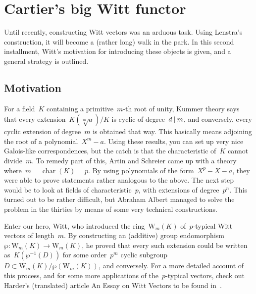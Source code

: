\section{Cartier's big Witt functor}
Until recently, constructing Witt vectors was an arduous task. Using Lenstra's construction, it will become a (rather long) walk in the park. In this second installment, Witt's motivation for introducing these objects is given, and a general strategy is outlined.

\subsection{Motivation}
For a field~$K$ containing a primitive~$m$-th root of unity, Kummer theory says that every extension~$K(\sqrt[m]a)/K$ is cyclic of degree~$d\mathbin{|} m$, and conversely, every cyclic extension of degree~$m$ is obtained that way. This basically means adjoining the root of a polynomial~$X^{m}-a$. Using these results, you can set up very nice Galois-like correspondences, but the catch is that the characteristic of~$K$ cannot divide~$m$. To remedy part of this, Artin and Schreier came up with a theory where~$m = \operatorname{char}(K) = p$. By using polynomials of the form~$X^{p}-X-a$, they were able to prove statements rather analogous to the above. The next step would be to look at fields of characteristic~$p$, with extensions of degree~$p^{n}$. This turned out to be rather difficult, but Abraham Albert managed to solve the problem in the thirties by means of some very technical constructions.

Enter our hero, Witt, who introduced the ring~$\mathrm{W}_{m}(K)$ of~$p$-typical Witt vectors of length~$m$. By constructing an (additive) group endomorphism~$\wp\colon\mathrm{W}_{m}(K)\to\mathrm{W}_{m}(K)$, he proved that every such extension could be written as~$K(\wp^{−1}(D))$ for some order~$p^{m}$ cyclic subgroup~$D\subset\mathrm{W}_{m}(K)/\wp(\mathrm{W}_{m}(K))$, and conversely. For a more detailed account of this process, and for some more applications of the~$p$-typical vectors, check out Harder's (translated) article An Essay on Witt Vectors to be found in~\cite{witt-collected}.

